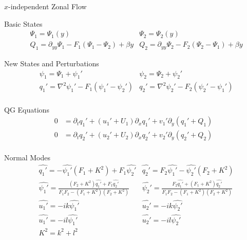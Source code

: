 \documentclass[12pt]{article}
\begin{document}
    \newpage
    \begin{section}{$x$-independent Zonal Flow}
        \begin{subsection}{Basic States}
            \begin{align*}
                &\Psi_1 = \Psi_1(y)
                &\Psi_2 = \Psi_2(y) \\
                &Q_1 = \partial_{yy}\Psi_1 - F_1(\Psi_1 - \Psi_2) + \beta y
                &Q_2 = \partial_{yy}\Psi_2 - F_2(\Psi_2 - \Psi_1) + \beta y
            \end{align*}
        \end{subsection}

        \begin{subsection}{New States and Perturbations}
            \begin{align*}
                 &\psi_1 = \Psi_1 + \psi_1'
                 &\psi_2 = \Psi_2 + \psi_2' \\
                 &q_1' = \nabla^2\psi_1' - F_1(\psi_1' - \psi_2')
                 &q_2' = \nabla^2\psi_2' - F_2(\psi_2' - \psi_1') \\
            \end{align*}
        \end{subsection}

        \begin{subsection}{QG Equations}
            \begin{align*}
                 0 &= \partial_t q_1' + (u_1' + U_1)\partial_x q_1' + v_1' \partial_y(q_1' + Q_1) \\
                 0 &= \partial_t q_2' + (u_2' + U_2)\partial_x q_2' + v_2' \partial_y(q_2' + Q_2) \\
            \end{align*}
        \end{subsection}

        \begin{subsection}{Normal Modes}
            \begin{align*}
                 &\hat{q_1'} = -\hat{\psi_1'}(F_1 + K^2) + F_1\hat{\psi_2'}
                 &\hat{q_2'} = F_2\hat{\psi_1'} - \hat{\psi_2'}(F_2 + K^2) \\
                &\hat{\psi_1'} = \frac{(F_2 + K^2) \hat{q_1'} + F_1\hat{q_2'}}{F_1F_2 - (F_1 + K^2)(F_2 + K^2)}
                &\hat{\psi_2'} = \frac{F_2\hat{q_1'} + (F_1 + K^2)\hat{q_2'}}{F_1F_2 - (F_1 + K^2)(F_2 + K^2)} \\
                &\hat{u_1'} = -ik \hat{\psi_1'}
                &\hat{u_2'} = -ik \hat{\psi_2'} \\
                &\hat{u_1'} = -il \hat{\psi_1'}
                &\hat{u_2'} = -il \hat{\psi_2'} \\
                &K^2 = k^2 + l^2
            \end{align*}
        \end{subsection}
    \end{section}
\end{document}
